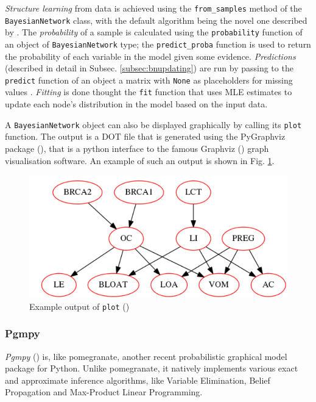\textit{Structure learning} from data is achieved using the \texttt{from\_samples} method of the \texttt{BayesianNetwork} class, with the default algorithm being the novel one described by \cite{schreiber_noble_2017}.
The \textit{probability} of a sample is calculated using the \texttt{probability} function of an object of \texttt{BayesianNetwork} type; the \texttt{predict\_proba} function is used to return the probability of each variable in the model given some evidence.
\textit{Predictions} (described in detail in Subsec. \ref{subsec:bnupdating}) are run by passing to the \texttt{predict} function of an object a matrix with \texttt{None} as placeholders for missing values .
\textit{Fitting} is done thought the \texttt{fit} function that uses MLE estimates to update each node's distribution in the model based on the input data.

A \texttt{BayesianNetwork} object can also be displayed graphically by calling its \texttt{plot} function.
The output is a DOT file that is generated using the PyGraphviz package (\cite{pygraphviz}), that is a python interface to the famous Graphviz (\cite{graphviz}) graph visualisation software.
An example of such an output is shown in Fig. \ref{fig:pomegranate_graph_example}.

\begin{figure}[htbp]
\centerline{\includegraphics[width=\columnwidth]{methodology/images/pomegranate_example}}
\caption{Example output of \texttt{plot} (\cite{pomegranatetutorial}) }
\label{fig:pomegranate_graph_example}
\end{figure}

\subsubsection{Pgmpy}
\textit{Pgmpy} (\cite{pgmpy}) is, like pomegranate, another recent probabilistic graphical model package for Python.
Unlike pomegranate, it natively implements various exact and approximate inference algorithms, like Variable Elimination, Belief Propagation and Max-Product Linear Programming.

